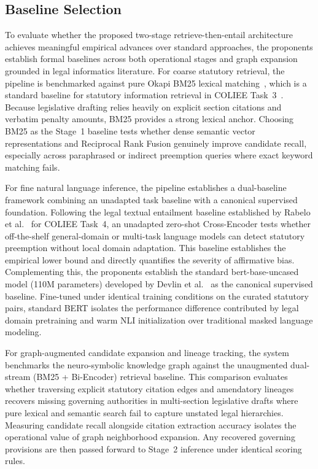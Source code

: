     \subsection{Baseline Selection}
    \label{sec:baseline_selection}
    To evaluate whether the proposed two-stage retrieve-then-entail architecture achieves meaningful empirical advances over standard approaches, the proponents establish formal baselines across both operational stages and graph expansion grounded in legal informatics literature. For coarse statutory retrieval, the pipeline is benchmarked against pure Okapi BM25 lexical matching~\cite{robertson2009probabilistic}, which is a standard baseline for statutory information retrieval in COLIEE Task~3~\cite{rabelo2022coliee}. Because legislative drafting relies heavily on explicit section citations and verbatim penalty amounts, BM25 provides a strong lexical anchor. Choosing BM25 as the Stage~1 baseline tests whether dense semantic vector representations and Reciprocal Rank Fusion genuinely improve candidate recall, especially across paraphrased or indirect preemption queries where exact keyword matching fails.

    For fine natural language inference, the pipeline establishes a dual-baseline framework combining an unadapted task baseline with a canonical supervised foundation. Following the legal textual entailment baseline established by Rabelo et al.~\cite{rabelo2022coliee} for COLIEE Task~4, an unadapted zero-shot Cross-Encoder tests whether off-the-shelf general-domain or multi-task language models can detect statutory preemption without local domain adaptation. This baseline establishes the empirical lower bound and directly quantifies the severity of affirmative bias. Complementing this, the proponents establish the standard bert-base-uncased model (110M parameters) developed by Devlin et al.~\cite{devlin2019bert} as the canonical supervised baseline. Fine-tuned under identical training conditions on the curated statutory pairs, standard BERT isolates the performance difference contributed by legal domain pretraining and warm NLI initialization over traditional masked language modeling.

    For graph-augmented candidate expansion and lineage tracking, the system benchmarks the neuro-symbolic knowledge graph against the unaugmented dual-stream (BM25 + Bi-Encoder) retrieval baseline. This comparison evaluates whether traversing explicit statutory citation edges and amendatory lineages recovers missing governing authorities in multi-section legislative drafts where pure lexical and semantic search fail to capture unstated legal hierarchies. Measuring candidate recall alongside citation extraction accuracy isolates the operational value of graph neighborhood expansion. Any recovered governing provisions are then passed forward to Stage~2 inference under identical scoring rules.

